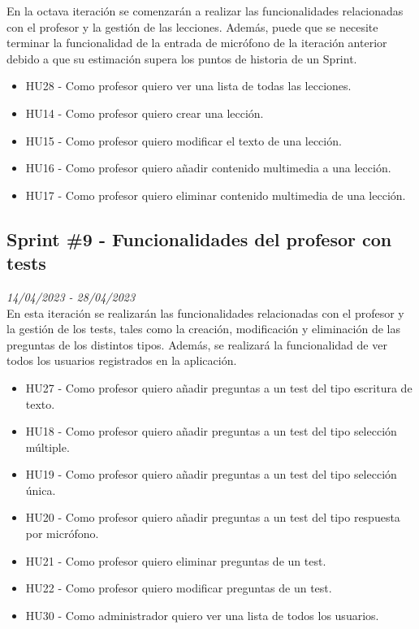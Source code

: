En la octava iteración se comenzarán a realizar las funcionalidades relacionadas con el profesor y la gestión de las lecciones.
Además, puede que se necesite terminar la funcionalidad de la entrada de micrófono de la iteración anterior debido a que su estimación
supera los puntos de historia de un Sprint.


\begin{itemize}
    \item HU28 - Como profesor quiero ver una lista de todas las lecciones.
    \item HU14 - Como profesor quiero crear una lección.
    \item HU15 - Como profesor quiero modificar el texto de una lección.
    \item HU16 - Como profesor quiero añadir contenido multimedia a una lección.
    \item HU17 - Como profesor quiero eliminar contenido multimedia de una lección.
\end{itemize}

\subsection{Sprint \#9 - Funcionalidades del profesor con tests}
\textit{14/04/2023   -   28/04/2023}\\

En esta iteración se realizarán las funcionalidades relacionadas con el profesor y la gestión de los tests, tales como la creación, modificación y eliminación de las preguntas
de los distintos tipos. Además, se realizará la funcionalidad de ver todos los usuarios registrados en la aplicación.


\begin{itemize}
    \item HU27 - Como profesor quiero añadir preguntas a un test del tipo escritura de texto.
    \item HU18 - Como profesor quiero añadir preguntas a un test del tipo selección múltiple.
    \item HU19 - Como profesor quiero añadir preguntas a un test del tipo selección única.
    \item HU20 - Como profesor quiero añadir preguntas a un test del tipo respuesta por micrófono.
    \item HU21 - Como profesor quiero eliminar preguntas de un test.
    \item HU22 - Como profesor quiero modificar preguntas de un test.
    \item HU30 - Como administrador quiero ver una lista de todos los usuarios.
\end{itemize}



